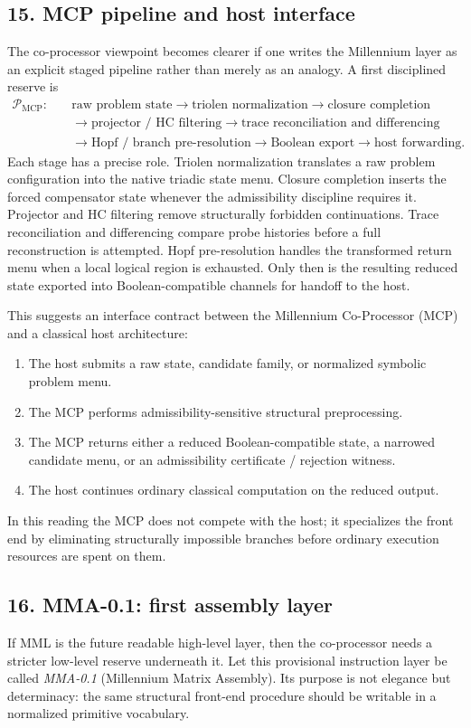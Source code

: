 \subsection*{15. MCP pipeline and host interface}
The co-processor viewpoint becomes clearer if one writes the Millennium layer as an explicit staged pipeline rather than merely as an analogy. A first disciplined reserve is
\[
\begin{aligned}
\mathcal P_{\mathrm{MCP}}:\quad &\text{raw problem state} \to \text{triolen normalization} \to \text{closure completion}\\
&\to \text{projector / HC filtering} \to \text{trace reconciliation and differencing}\\
&\to \text{Hopf / branch pre-resolution} \to \text{Boolean export} \to \text{host forwarding}.
\end{aligned}
\]
Each stage has a precise role. Triolen normalization translates a raw problem configuration into the native triadic state menu. Closure completion inserts the forced compensator state whenever the admissibility discipline requires it. Projector and HC filtering remove structurally forbidden continuations. Trace reconciliation and differencing compare probe histories before a full reconstruction is attempted. Hopf pre-resolution handles the transformed return menu when a local logical region is exhausted. Only then is the resulting reduced state exported into Boolean-compatible channels for handoff to the host.

This suggests an interface contract between the Millennium Co-Processor (MCP) and a classical host architecture:
\begin{enumerate}[leftmargin=2em,label=\arabic*.]
  \item The host submits a raw state, candidate family, or normalized symbolic problem menu.
  \item The MCP performs admissibility-sensitive structural preprocessing.
  \item The MCP returns either a reduced Boolean-compatible state, a narrowed candidate menu, or an admissibility certificate / rejection witness.
  \item The host continues ordinary classical computation on the reduced output.
\end{enumerate}
In this reading the MCP does not compete with the host; it specializes the front end by eliminating structurally impossible branches before ordinary execution resources are spent on them.

\subsection*{16. MMA-0.1: first assembly layer}
If MML is the future readable high-level layer, then the co-processor needs a stricter low-level reserve underneath it. Let this provisional instruction layer be called \emph{MMA-0.1} (Millennium Matrix Assembly). Its purpose is not elegance but determinacy: the same structural front-end procedure should be writable in a normalized primitive vocabulary.

